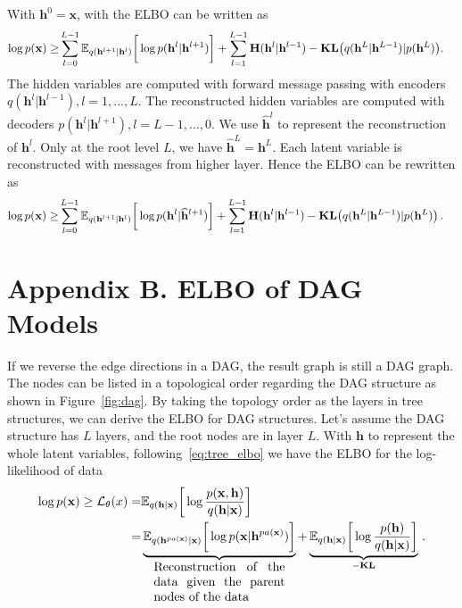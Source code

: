 \documentclass{article} %
\begin{document}
With $\mathbf{h}^0 = \mathbf{x}$,  with the ELBO can be written as 
\begin{align*}
\log p(\mathbf{x}) \geq &   \sum_{l=0}^{L-1}  \mathbb{E}_{q(\mathbf{h}^{l+1}|\mathbf{h}^l)} \bigg[ \log p( \mathbf{h}^{l}|  \mathbf{h}^{l+1})   \bigg] +  \sum_{l=1}^{L-1}   \textbf{\text{H}}(\mathbf{h}^l | \mathbf{h}^{l-1} ) -   \textbf{\text{KL}}\big(q(\mathbf{h}^L | \mathbf{h}^{L-1} )   | p(\mathbf{h}^L)  \big) . 
 \end{align*}
The hidden variables are computed with forward message passing with encoders $q(\mathbf{h}^l | \mathbf{h}^{l-1}), l = 1,..., L$. The reconstructed hidden variables are computed with decoders $p(\mathbf{h}^l | \mathbf{h}^{l+1}), l = L-1, ..., 0$. We use $\widehat{\mathbf{h}}^l$ to represent the reconstruction of $\mathbf{h}^l$. Only at the root level $L$, we have $\widehat{\mathbf{h}}^L = \mathbf{h}^L$. Each latent variable is reconstructed with messages from higher layer. Hence the ELBO can be rewritten as 
\begin{align*}
\log p(\mathbf{x}) \geq &   \sum_{l=0}^{L-1}  \mathbb{E}_{q(\mathbf{h}^{l+1}|\mathbf{h}^l)} \bigg[ \log p( \mathbf{h}^{l}|  \widehat{\mathbf{h}}^{l+1})   \bigg] +  \sum_{l=1}^{L-1}   \textbf{\text{H}}(\mathbf{h}^l | \mathbf{h}^{l-1} ) -   \textbf{\text{KL}}\big(q(\mathbf{h}^L | \mathbf{h}^{L-1} )   | p(\mathbf{h}^L)  \big) \, .
 \end{align*}


\section*{Appendix B.  ELBO of DAG Models}\label{appd:dag_elbo}

If we reverse the edge directions in a DAG, the  result graph is still a DAG graph.  The nodes can be listed in a topological order regarding the DAG structure as shown in Figure~\ref{fig:dag}. By taking the topology order as the layers in tree structures, we can derive the ELBO for DAG structures.  Let's assume the DAG structure has $L$ layers, and the root nodes are in layer $L$. With $\mathbf{h}$ to represent the whole latent variables, following~\eqref{eq:tree_elbo} we have the ELBO for the log-likelihood of  data 
\begin{align}  \label{eq:dag_elbo}
\log p(\mathbf{x})  \geq  \mathcal{L}_{\theta}(x)  = &  \mathbb{E}_{q(\mathbf{h} | \mathbf{x})} \bigg[ \log  \frac{p(\mathbf{x}, \mathbf{h})}{q(\mathbf{h}|\mathbf{x})}  \bigg]  \\ \notag
=&  \underbrace{ \mathbb{E}_{q(\mathbf{h}^{pa(\mathbf{x})} | \mathbf{x})} \bigg[ \log  p(\mathbf{x} | \mathbf{h}^{pa(\mathbf{x})})  \bigg] }_{  \parbox{10.5em}{Reconstruction of the data given the parent nodes of the data}}  +  \underbrace{  \mathbb{E}_{q(\mathbf{h}| \mathbf{x})} \bigg[ \log  \frac{p( \mathbf{h})}{q(\mathbf{h}|\mathbf{x})}  \bigg] }_{-\textbf{\text{KL}}} \, .   \notag
\end{align}
\end{document}
